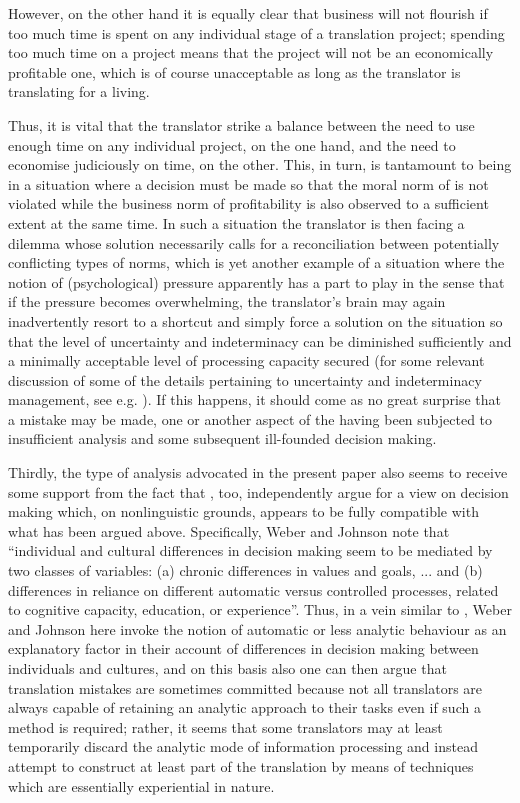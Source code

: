 \documentclass[output=paper]{LSP/langsci}
\begin{document}
  However, on the other hand it is equally clear that business will not flourish if too much time is spent on any individual stage of a translation project; spending too much time on a project means that the project will not be an economically profitable one, which is of course unacceptable as long as the translator is translating for a living.

  Thus, it is vital that the translator strike a balance between the need to use enough time on any individual project, on the one hand, and the need to economise judiciously on time, on the other. This, in turn, is tantamount to being in a situation where a decision must be made so that the moral norm of  is not violated while the business norm of profitability is also observed to a sufficient extent at the same time. In such a situation the translator is then facing a dilemma whose solution necessarily calls for a reconciliation between potentially conflicting types of norms, which is yet another example of a situation where the notion of (psychological) pressure apparently has a part to play in the sense that if the pressure becomes overwhelming, the translator's brain may again inadvertently resort to a shortcut and simply force a solution on the situation so that the level of uncertainty and indeterminacy can be diminished sufficiently and a minimally acceptable level of processing capacity secured (for some relevant discussion of some of the details pertaining to uncertainty and indeterminacy management, see e.g. \citealt{Gudykunst1988, Angelone2010}). If this happens, it should come as no great surprise that a mistake may be made, one or another aspect of the  having been subjected to insufficient analysis and some subsequent ill-founded decision making.

  Thirdly, the type of analysis advocated in the present paper also seems to receive some support from the fact that \citet[72]{Weber2009}, too, independently argue for a view on decision making which, on nonlinguistic grounds, appears to be fully compatible with what has been argued above. Specifically, Weber and Johnson note that ``individual and cultural differences in decision making seem to be mediated by two classes of variables: (a) chronic differences in values and goals, ...  and (b) differences in reliance on different automatic versus controlled processes, related to cognitive capacity, education, or experience''. Thus, in a vein similar to \citet{Berger2007}, Weber and Johnson here invoke the notion of automatic or less analytic behaviour as an explanatory factor in their account of differences in decision making between individuals and cultures, and on this basis also one can then argue that translation mistakes are sometimes committed because not all translators are always capable of retaining an analytic approach to their tasks even if such a method is required; rather, it seems that some translators may at least temporarily discard the analytic mode of information processing and instead attempt to construct at least part of the translation by means of techniques which are essentially experiential in nature.
\end{document}
